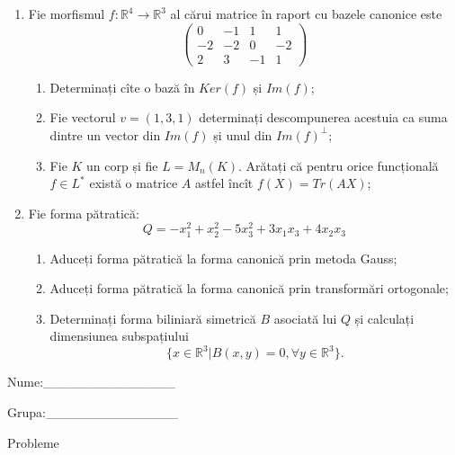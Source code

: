 \documentclass{article}
\begin{document}
\begin{enumerate}
 \item Fie morfismul $f:\mathbb{R}^4 \to \mathbb{R}^3$ al cărui matrice în raport cu bazele canonice este
$$\begin{pmatrix}
0&-1&1&1\\
-2&-2&0&-2\\
2&3&-1&1
\end{pmatrix}$$

\begin{enumerate}
\item Determinați cîte o bază în $Ker(f)$ și $Im(f)$;
\item Fie vectorul $v=(1,3,1)$ determinați descompunerea acestuia ca suma dintre un vector din $Im(f)$ și unul din $Im(f)^\perp$;
\item Fie $K$ un corp și fie $L=M_n(K)$. Arătați că pentru orice funcțională $f \in L^*$ există o matrice $A$ astfel încît $f(X)=Tr(AX)$;
\end{enumerate}
\item Fie forma pătratică:
$$Q= -x_1^2+x_2^2-5x_3^2+3x_1x_3+4x_2x_3$$

\begin{enumerate}
\item Aduceți forma pătratică la forma canonică prin metoda Gauss;
\item Aduceți forma pătratică la forma canonică prin transformări ortogonale;
\item Determinați forma biliniară simetrică $B$ asociată lui $Q$ și calculați dimensiunea subspațiului
$$\{x \in \mathbb{R}^3 | B(x,y)=0,\forall y \in \mathbb{R}^3\}.$$

\end{enumerate}
\end{enumerate}
\newpage
\begin{flushright}
Nume:\_\_\_\_\_\_\_\_\_\_\_\_\_\_
 
 
Grupa:\_\_\_\_\_\_\_\_\_\_\_\_\_\_
\end{flushright}
\begin{center}
\vspace{2cm}
{\Large Probleme}
\vspace{2cm}
\end{center}
\end{document}

